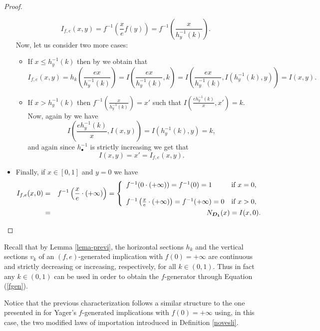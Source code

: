 \begin{proof}
\begin{itemize}
		$$I_{f,e}(x,y)=f^{-1}\left(\frac{x}{e}f(y)\right)=f^{-1}\left(\frac{x}{h_y^{-1}(k)}\right).$$
		Now, let us consider two more cases:
		\begin{itemize}
			\item If $ x \leq h_y^{-1}(k)$ then by \LIex we obtain that
			$$I_{f,e}(x,y)=h_k\left(\frac{ex}{h_y^{-1}(k)}\right) = I\left(\frac{ex}{h_y^{-1}(k)},k\right) = I\left(\frac{ex}{h_y^{-1}(k)}, I(h_y^{-1}(k),y)\right)=I(x,y).$$
			\item If $x> h_y^{-1}(k)$  then $f^{-1}\left(\frac{x}{h_y^{-1}(k)}\right)=x'$ such that $I\left(\frac{eh_y^{-1}(k)}{x},x'\right)=k$. Now, again by \LIex we have
			$$I \left(\frac{eh_y^{-1}(k)}{x},I(x,y)\right) = I(h_y^{-1}(k),y)=k,$$
			and again since $h_{\bullet}^{-1}$ is strictly increasing we  get that
			$$I(x,y)=x'=I_{f,e}(x,y).$$
		\end{itemize}
		\item Finally, if $x \in [0,1]$ and $y=0$ we have
		\begin{eqnarray*}
		I_{f,e}(x,0)&=&f^{-1}\left( \frac{x}{e} \cdot (+ \infty) \right)= \left\{ \begin{array}{ll}
			f^{-1}(0 \cdot (+\infty))=f^{-1}(0)=1 &   \text{if }   x=0, \\
			\\ f^{-1}\left(\frac{x}{e} \cdot (+\infty)\right)= f^{-1}(+\infty)=0 &\text{if } x>0,
		\end{array} \right. \\
		&=&N_{\bm{D_1}}(x)=I(x,0).
		\end{eqnarray*} 
	\end{itemize}
\end{proof}
\begin{remark}\label{rmk2f}
	Recall that by Lemma \ref{lema-previ}, the horizontal sections $h_k$ and the vertical sections $v_k$ of an $(f,e)$-generated implication with $f(0)=+\infty$ are continuous and strictly decreasing or increasing, respectively, for all $k\in(0,1)$. Thus in fact any $k\in(0,1)$ can be used in order to obtain the $f$-generator through Equation (\ref{fgen}). 
\end{remark}

Notice that the previous characterization follows a similar structure to the one presented in \cite{Massanet2012B} for Yager's $f$-generated implications with $f(0)=+\infty$ using, in this case, the two modified laws of importation introduced in Definition \ref{novesli}.

